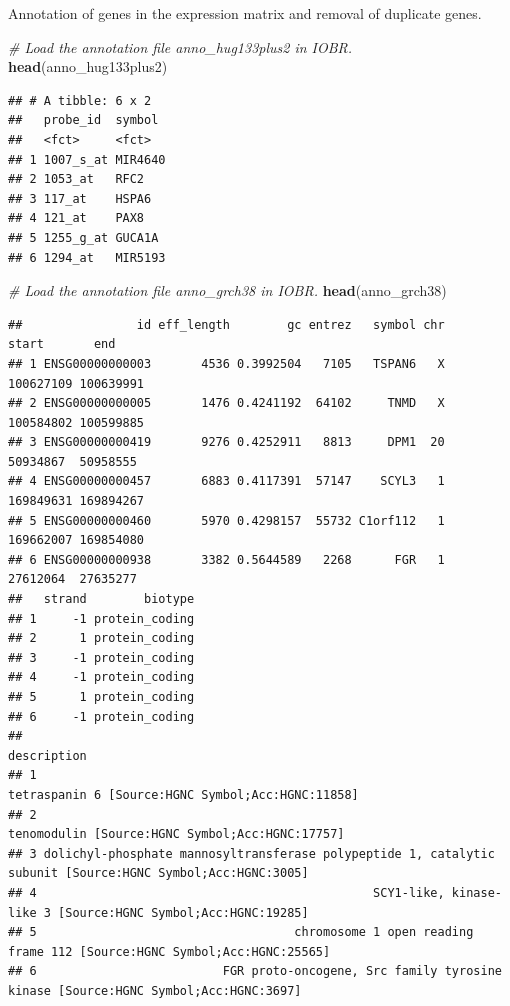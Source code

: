 \documentclass[
  12pt,
]{book}
\newenvironment{Shaded}{\begin{snugshade}}{\end{snugshade}}
\newcommand{\CommentTok}[1]{\textcolor[rgb]{0.56,0.35,0.01}{\textit{#1}}}
\newcommand{\FunctionTok}[1]{\textcolor[rgb]{0.13,0.29,0.53}{\textbf{#1}}}
\newcommand{\NormalTok}[1]{#1}
\begin{document}
Annotation of genes in the expression matrix and removal of duplicate genes.

\begin{Shaded}
\begin{Highlighting}[]
\CommentTok{\# Load the annotation file \textasciigrave{}anno\_hug133plus2\textasciigrave{} in IOBR.}
\FunctionTok{head}\NormalTok{(anno\_hug133plus2)}
\end{Highlighting}
\end{Shaded}

\begin{verbatim}
## # A tibble: 6 x 2
##   probe_id  symbol 
##   <fct>     <fct>  
## 1 1007_s_at MIR4640
## 2 1053_at   RFC2   
## 3 117_at    HSPA6  
## 4 121_at    PAX8   
## 5 1255_g_at GUCA1A 
## 6 1294_at   MIR5193
\end{verbatim}

\begin{Shaded}
\begin{Highlighting}[]
\CommentTok{\# Load the annotation file \textasciigrave{}anno\_grch38\textasciigrave{} in IOBR.}
\FunctionTok{head}\NormalTok{(anno\_grch38)}
\end{Highlighting}
\end{Shaded}

\begin{verbatim}
##                id eff_length        gc entrez   symbol chr     start       end
## 1 ENSG00000000003       4536 0.3992504   7105   TSPAN6   X 100627109 100639991
## 2 ENSG00000000005       1476 0.4241192  64102     TNMD   X 100584802 100599885
## 3 ENSG00000000419       9276 0.4252911   8813     DPM1  20  50934867  50958555
## 4 ENSG00000000457       6883 0.4117391  57147    SCYL3   1 169849631 169894267
## 5 ENSG00000000460       5970 0.4298157  55732 C1orf112   1 169662007 169854080
## 6 ENSG00000000938       3382 0.5644589   2268      FGR   1  27612064  27635277
##   strand        biotype
## 1     -1 protein_coding
## 2      1 protein_coding
## 3     -1 protein_coding
## 4     -1 protein_coding
## 5      1 protein_coding
## 6     -1 protein_coding
##                                                                                                  description
## 1                                                          tetraspanin 6 [Source:HGNC Symbol;Acc:HGNC:11858]
## 2                                                            tenomodulin [Source:HGNC Symbol;Acc:HGNC:17757]
## 3 dolichyl-phosphate mannosyltransferase polypeptide 1, catalytic subunit [Source:HGNC Symbol;Acc:HGNC:3005]
## 4                                               SCY1-like, kinase-like 3 [Source:HGNC Symbol;Acc:HGNC:19285]
## 5                                    chromosome 1 open reading frame 112 [Source:HGNC Symbol;Acc:HGNC:25565]
## 6                          FGR proto-oncogene, Src family tyrosine kinase [Source:HGNC Symbol;Acc:HGNC:3697]
\end{verbatim}
\end{document}
